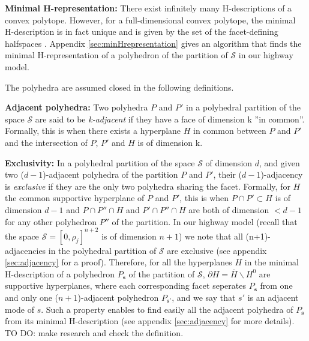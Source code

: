 \documentclass[11pt]{article}
\numberwithin{equation}{section}
\numberwithin{figure}{section}
\numberwithin{table}{section}
\begin{document}
\hspace{10mm}

\noindent \textbf{Minimal H-representation: }There exist infinitely many H-descriptions of a convex polytope. However, for a full-dimensional convex polytope, the minimal H-description is in fact unique and is given by the set of the facet-defining halfspaces \cite{Gruenbaum2003}. Appendix \ref{sec:minHrepresentation} gives an algorithm that finds the minimal H-representation of a polyhedron of the partition of $\mathcal{S}$ in our highway model.

\hspace{10mm}

\noindent The polyhedra are assumed closed in the following definitions.

\hspace{10mm}

\noindent \textbf{Adjacent polyhedra: } Two polyhedra $P$ and $P'$ in a polyhedral partition of the space $\mathcal{S}$ are said to be \textit{k-adjacent} if they have a face of dimension k ''in common''. Formally, this is when there exists a hyperplane $H$ in common between $P$ and $P'$ and the intersection of $P$, $P'$ and $H$ is of dimension k. 

\hspace{10mm}

\noindent \textbf{Exclusivity: } In a polyhedral partition of the space $\mathcal{S}$ of dimension $d$, and given two ($d-1$)-adjacent polyhedra of the partition $P$ and $P'$, their ($d-1$)-adjacency is \textit{exclusive} if they are the only two polyhedra sharing the facet. Formally, for $H$ the common supportive hyperplane of $P$ and $P'$, this is when $P\cap P'\subset H$ is of dimension $d-1$ and $P\cap P''\cap H$ and $P'\cap P''\cap H$ are both of dimension $<d-1$ for any other polyhedron $P''$ of the partition. In our highway model (recall that the space $\mathcal{S} = [0,\rho_{j}]^{n+2}$ is of dimension $n+1$) we note that all (n+1)-adjacencies in the polyhedral partition of $\mathcal{S}$ are exclusive (see appendix \ref{sec:adjacency} for a proof). Therefore, for all the hyperplanes $H$ in the minimal H-description of a polyhedron $P_{\boldsymbol s}$ of the partition of $\mathcal{S}$, $\partial H=\bar{H}\backslash H^{0}$ are supportive hyperplanes, where each corresponding facet seperates $P_{\boldsymbol s}$ from one and only one ($n+1$)-adjacent polyhedron $P_{\boldsymbol s'}$, and we say that $s'$ is an adjacent mode of $s$. Such a property enables to find easily all the adjacent polyhedra of $P_{\boldsymbol s}$ from its minimal H-description (see appendix \ref{sec:adjacency} for more details). TO DO: make research and check the definition.
\end{document}
